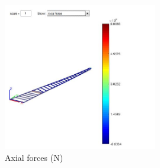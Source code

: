 \begin{figure}[h]
	\centering
	\includegraphics[width=0.6\textwidth]{img/AxialForce.jpg}
	\caption{Axial forces (N)}
	\label{fig:axial_force}
\end{figure}

